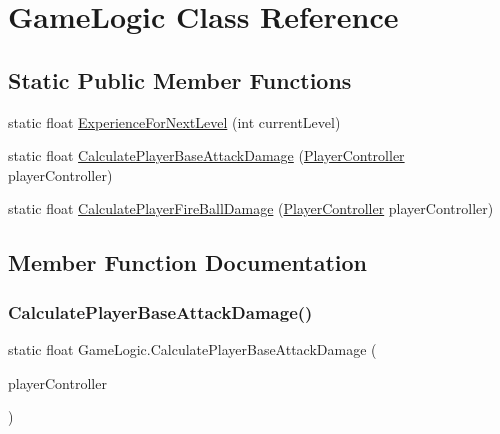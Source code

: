\hypertarget{class_game_logic}{}\section{Game\+Logic Class Reference}
\label{class_game_logic}
\subsection*{Static Public Member Functions}
\begin{DoxyCompactItemize}
\item 
static float \hyperlink{class_game_logic_a7ef74366346ed65630395fb9bf33c7f9}{Experience\+For\+Next\+Level} (int current\+Level)
\item 
static float \hyperlink{class_game_logic_ae5cdf1be0742f8a8af0821437d09442d}{Calculate\+Player\+Base\+Attack\+Damage} (\hyperlink{class_player_controller}{Player\+Controller} player\+Controller)
\item 
static float \hyperlink{class_game_logic_a46f0fff3a959896924ec24700c8f966f}{Calculate\+Player\+Fire\+Ball\+Damage} (\hyperlink{class_player_controller}{Player\+Controller} player\+Controller)
\end{DoxyCompactItemize}


\subsection{Member Function Documentation}
\mbox{\label{class_game_logic_ae5cdf1be0742f8a8af0821437d09442d}} 
\subsubsection{\texorpdfstring{Calculate\+Player\+Base\+Attack\+Damage()}{CalculatePlayerBaseAttackDamage()}}
{\footnotesize\ttfamily static float Game\+Logic.\+Calculate\+Player\+Base\+Attack\+Damage (\begin{DoxyParamCaption}\item[{\hyperlink{class_player_controller}{Player\+Controller}}]{player\+Controller }\end{DoxyParamCaption})\hspace{0.3cm}{\ttfamily [static]}}

